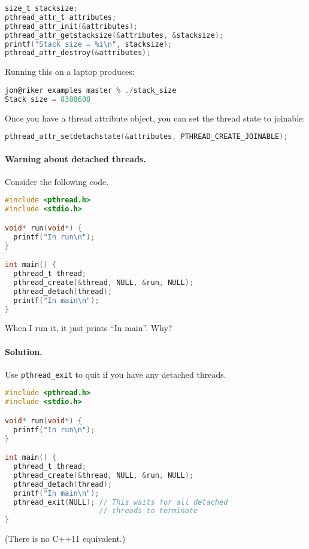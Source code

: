   \begin{lstlisting}[language=C]
size_t stacksize;
pthread_attr_t attributes;
pthread_attr_init(&attributes);
pthread_attr_getstacksize(&attributes, &stacksize);
printf("Stack size = %i\n", stacksize);
pthread_attr_destroy(&attributes);
  \end{lstlisting}

Running this on a laptop produces:

  \begin{lstlisting}[language=C]
jon@riker examples master % ./stack_size 
Stack size = 8388608
  \end{lstlisting}

Once you have a thread attribute object, you can set the thread state to joinable:
  \begin{lstlisting}[language=C]
pthread_attr_setdetachstate(&attributes, PTHREAD_CREATE_JOINABLE);
  \end{lstlisting}

\paragraph{Warning about detached threads.} Consider the following code.

\begin{lstlisting}[language=C]
#include <pthread.h>
#include <stdio.h>

void* run(void*) {
  printf("In run\n");
}

int main() {
  pthread_t thread;
  pthread_create(&thread, NULL, &run, NULL);
  pthread_detach(thread);
  printf("In main\n");
}
\end{lstlisting}

  When I run it, it just prints ``In main''. Why?

\paragraph{Solution.} Use {\tt pthread\_exit} to quit if you have any detached threads.
  \begin{lstlisting}[language=C]
#include <pthread.h>
#include <stdio.h>

void* run(void*) {
  printf("In run\n");
}

int main() {
  pthread_t thread;
  pthread_create(&thread, NULL, &run, NULL);
  pthread_detach(thread);
  printf("In main\n");
  pthread_exit(NULL); // This waits for all detached
                      // threads to terminate
}
  \end{lstlisting}
(There is no C++11 equivalent.)

